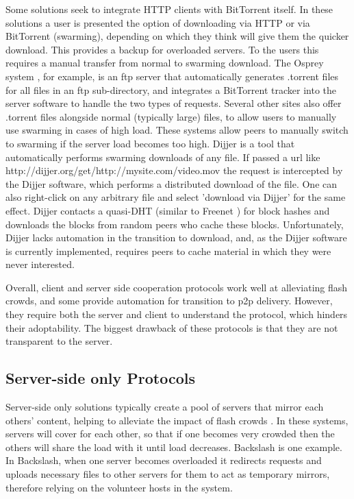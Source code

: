 Some solutions seek to integrate HTTP clients with BitTorrent itself.  In these solutions a user is presented the option of downloading via HTTP or via BitTorrent (swarming), depending on which they think will give them the quicker download.  This provides a backup for overloaded servers.  To the users this requires a manual transfer from normal to swarming download.  The Osprey system \cite{osprey}, for example, is an ftp server that automatically generates .torrent files for all files in an ftp sub-directory, and integrates a BitTorrent tracker into the server software to handle the two types of requests.  Several other sites also offer .torrent files alongside normal (typically large) files, to allow users to manually use swarming in cases of high load.  These systems allow peers to manually switch to swarming if the server load becomes too high.  Dijjer \cite{dijjer} is a tool that automatically performs swarming downloads of any file.  If passed a url like http://dijjer.org/get/http://mysite.com/video.mov the request is intercepted by the Dijjer software, which performs a distributed download of the file.  One can also right-click on any arbitrary file and select 'download via Dijjer' for the same effect.  Dijjer contacts a quasi-DHT (similar to Freenet \cite{freenet}) for block hashes and downloads the blocks from random peers who cache these blocks.  Unfortunately, Dijjer lacks automation in the transition to download, and, as the Dijjer software is currently implemented, requires peers to cache material in which they were never interested.  

Overall, client and server side cooperation protocols work well at alleviating flash crowds, and some provide automation for transition to p2p delivery.  However, they require both the server and client to understand the protocol, which hinders their adoptability.  The biggest drawback of these protocols is that they are not transparent to the server.

\subsection{Server-side only Protocols}
Server-side only solutions typically create a pool of servers that mirror each others' content, helping to alleviate the impact of flash crowds \cite{backslash, dotSlash}.  In these systems, servers will cover for each other, so that if one becomes very crowded then the others will share the load with it until load decreases.  Backslash \cite{backslash} is one example.  In Backslash, when one server becomes overloaded it redirects requests and uploads necessary files to other servers for them to act as temporary mirrors, therefore relying on the volunteer hosts in the system.  

